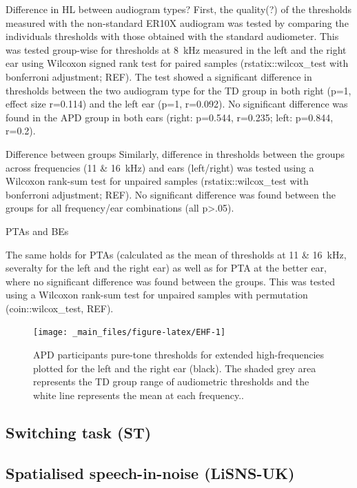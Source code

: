 \documentclass[a4paper, twoside]{templates/ociamthesis}
\begin{document}
\colorbox[HTML]{CCCCFF}{Difference in HL between audiogram types?}
First, the quality(?) of the thresholds measured with the non-standard ER10X audiogram was tested by comparing the individuals thresholds with those obtained with the standard audiometer. This was tested group-wise for thresholds at 8~kHz measured in the left and the right ear using Wilcoxon signed rank test for paired samples (rstatix::wilcox\_test with bonferroni adjustment; REF). The test showed a significant difference in thresholds between the two audiogram type for the TD group in both right (p=1, effect size r=0.114) and the left ear (p=1, r=0.092). No significant difference was found in the APD group in both ears (right: p=0.544, r=0.235; left: p=0.844, r=0.2).

\colorbox[HTML]{CCCCFF}{Difference between groups}
Similarly, difference in thresholds between the groups across frequencies (11 \& 16~kHz) and ears (left/right) was tested using a Wilcoxon rank-sum test for unpaired samples (rstatix::wilcox\_test with bonferroni adjustment; REF). No significant difference was found between the groups for all frequency/ear combinations (all p\textgreater.05).

\colorbox[HTML]{CCCCFF}{PTAs and BEs}

The same holds for PTAs (calculated as the mean of thresholds at 11 \& 16~kHz, severalty for the left and the right ear) as well as for PTA at the better ear, where no significant difference was found between the groups. This was tested using a Wilcoxon rank-sum test for unpaired samples with permutation (coin::wilcox\_test, REF).

\begin{figure}

{\centering \texttt{[image: \_main\_files/figure-latex/EHF-1]} 

}

\caption{APD participants pure-tone thresholds for extended high-frequencies plotted for the left and the right ear (black). The shaded grey area represents the TD group range of audiometric thresholds and the white line represents the mean at each frequency..}\label{fig:EHF}
\end{figure}

\hypertarget{switching-task-st-1}{%
\subsection{Switching task (ST)}\label{switching-task-st-1}}

\hypertarget{spatialised-speech-in-noise-lisns-uk-1}{%
\subsection{Spatialised speech-in-noise (LiSNS-UK)}\label{spatialised-speech-in-noise-lisns-uk-1}}
\end{document}

